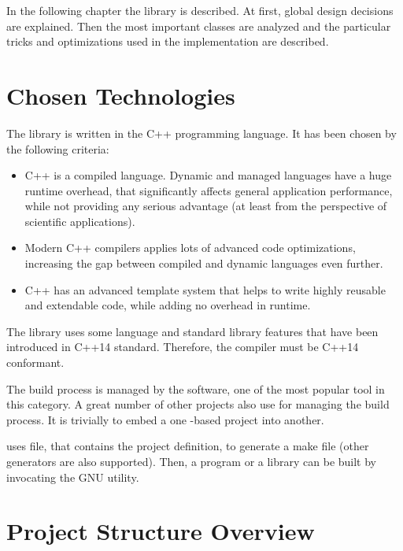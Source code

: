 In the following chapter the \numdbname library is described. At first, global design decisions are explained. Then the most important classes are analyzed and the particular tricks and optimizations used in the implementation are described.

\section{Chosen Technologies}

The library is written in the C++ programming language. It has been chosen by the following criteria:
\begin{itemize}
\item C++ is a compiled language. Dynamic and managed languages have a huge runtime overhead, that significantly affects general application performance, while not providing any serious advantage (at least from the perspective of scientific applications).
\item Modern C++ compilers applies lots of advanced code optimizations, increasing the gap between compiled and dynamic languages even further.
\item C++ has an advanced template system that helps to write highly reusable and extendable code, while adding no overhead in runtime.
\end{itemize}
The library uses some language and standard library features that have been introduced in C++14 standard. Therefore, the compiler must be C++14 conformant.

The build process is managed by the  software, one of the most popular tool in this category. A great number of other projects also use  for managing the build process. It is trivially to embed a one -based project into another.

 uses  file, that contains the project definition, to generate a make file (other generators are also supported). Then, a program or a library can be built by invocating the GNU  utility.

\section{Project Structure Overview}


